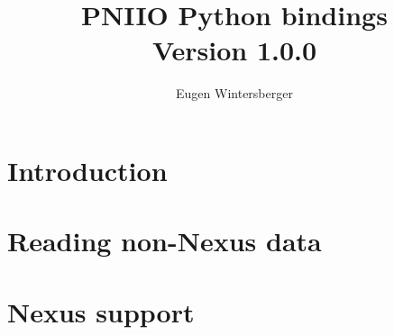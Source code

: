 \documentclass{scrbook}
\title{{\Huge PNIIO Python bindings}\\
       Version 1.0.0}
\author{Eugen Wintersberger}
\begin{document}
\maketitle
\tableofcontents

\chapter{Introduction}


\chapter{Reading non-Nexus data}

\chapter{Nexus support}
\end{document}
